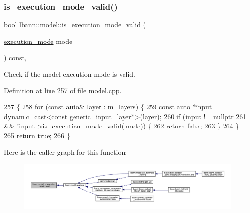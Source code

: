 \subsubsection{\texorpdfstring{is\+\_\+execution\+\_\+mode\+\_\+valid()}{is\_execution\_mode\_valid()}}
{\footnotesize\ttfamily bool lbann\+::model\+::is\+\_\+execution\+\_\+mode\+\_\+valid (\begin{DoxyParamCaption}\item[{\hyperlink{base_8hpp_a2781a159088df64ed7d47cc91c4dc0a8}{execution\+\_\+mode}}]{mode }\end{DoxyParamCaption}) const\hspace{0.3cm}{\ttfamily [protected]}, {\ttfamily [virtual]}}

Check if the model execution mode is valid. 

Definition at line 257 of file model.\+cpp.


\begin{DoxyCode}
257                                                              \{
258   \textcolor{keywordflow}{for} (\textcolor{keyword}{const} \textcolor{keyword}{auto}& layer : \hyperlink{classlbann_1_1model_a0229fc226ec163d1411548446104569d}{m\_layers}) \{
259     \textcolor{keyword}{const} \textcolor{keyword}{auto} *input = \textcolor{keyword}{dynamic\_cast<}\textcolor{keyword}{const }generic\_input\_layer*\textcolor{keyword}{>}(layer);
260     \textcolor{keywordflow}{if} (input != \textcolor{keyword}{nullptr}
261         && !input->is\_execution\_mode\_valid(mode)) \{
262       \textcolor{keywordflow}{return} \textcolor{keyword}{false};
263     \}
264   \}
265   \textcolor{keywordflow}{return} \textcolor{keyword}{true};
266 \}
\end{DoxyCode}
Here is the caller graph for this function\+:\nopagebreak
\begin{figure}[H]
\begin{center}
\leavevmode
\includegraphics[width=350pt]{classlbann_1_1model_a2c82c9def03b1c60e48f52fca7708833_icgraph}
\end{center}
\end{figure}
\mbox{\label{classlbann_1_1model_a2e02dda11636e015ea0c892ffa541881}} 

